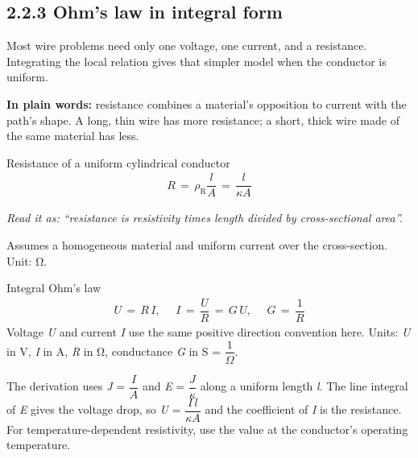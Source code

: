 \documentclass[11pt]{article}
\begin{document}
\begin{keepsection}
\section{2.2.3 Ohm’s law in integral form}

Most wire problems need only one voltage, one current, and a resistance. Integrating the local relation gives that simpler model when the conductor is uniform.

\begin{plainbox}\textbf{In plain words:} resistance combines a material’s opposition to current with the path’s shape. A long, thin wire has more resistance; a short, thick wire made of the same material has less.\end{plainbox}

\begin{equationcard}{Resistance of a uniform cylindrical conductor}
\[ \begin{gathered} {R}\, =\, ρ_{\mathrm{R}}\dfrac{{l}}{{A}}\, =\, \dfrac{{l}}{κ{A}} \end{gathered} \]
{\small \emph{Read it as: “resistance is resistivity times length divided by cross-sectional area”.}\par Assumes a homogeneous material and uniform current over the cross-section. Unit: Ω.}
\end{equationcard}

\begin{equationcard}{Integral Ohm’s law}
\[ \begin{gathered} {U}\, =\, {R\,I},\, \quad \, {I}\, =\, \dfrac{{U}}{{R}}\, =\, {G\,U},\, \quad \, {G}\, =\, \dfrac{1}{{R}} \end{gathered} \]
{\small Voltage \textit{U} and current \textit{I} use the same positive direction convention here. Units: \textit{U} in V, \textit{I} in A, \textit{R} in Ω, conductance \textit{G} in S = {\small\ensuremath{\dfrac{1}{Ω}}}.}
\end{equationcard}

The derivation uses \textit{J} = {\small\ensuremath{\dfrac{{I}}{{A}}}} and \textit{E} = {\small\ensuremath{\dfrac{{J}}{κ}}} along a uniform length \textit{l}. The line integral of \textit{E} gives the voltage drop, so \textit{U} = {\small\ensuremath{\dfrac{{I\,l}}{κ{A}}}} and the coefficient of \textit{I} is the resistance. For temperature-dependent resistivity, use the value at the conductor’s operating temperature.


\end{keepsection}
\end{document}
